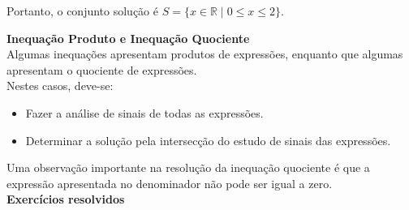 	Portanto, o conjunto solução é  $  S = \{ x \in \mathbb{R} \mid 0 \le x \le 2 \} $.

    \noindent
	\textbf{Inequação Produto e Inequação Quociente}\\
	
	Algumas inequações apresentam produtos de expressões, enquanto que algumas apresentam o quociente de expressões.\\
	
	Nestes casos, deve-se:
	
	\begin{itemize}
		\item Fazer a análise de sinais de todas as expressões.
		\item Determinar a solução pela intersecção do estudo de sinais das expressões.
	\end{itemize}
	
	Uma observação importante na resolução da inequação quociente é que a expressão apresentada no denominador não pode ser igual a zero.\\

    \noindent
	\textbf{Exercícios resolvidos}\\

